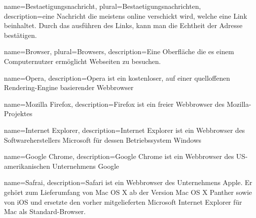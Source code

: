 \documentclass[parskip=full]{scrartcl}
\begin{document}

{
	name=Bestaetigungsnachricht,
	plural=Bestaetigungsnachrichten,
	description={eine Nachricht die meistens online verschickt wird, welche eine Link beinhaltet. Durch das ausführen des Links, kann man die Echtheit der Adresse bestätigen.}
}

{
	name=Browser,
	plural=Browsers,
	description={Eine Oberfläche die es einem \gls{Computer}nutzer ermöglicht Webseiten zu besuchen.}
}

{
	name=Opera,
	description={Opera ist ein kostenloser, auf einer quelloffenen Rendering-Engine basierender Webbrowser}
}

{
	name=Mozilla Firefox,
	description={Firefox ist ein freier Webbrowser des Mozilla-Projektes}
}

{
	name=Internet Explorer,
	description={Internet Explorer ist ein Webbrowser des Softwareherstellers Microsoft für dessen Betriebssystem Windows}
}

{
	name=Google Chrome,
	description={Google Chrome ist ein Webbrowser des US-amerikanischen Unternehmens Google}
}

{
	name=Safrai,
	description={Safari ist ein Webbrowser des Unternehmens Apple. Er gehört zum Lieferumfang von Mac OS X ab der Version Mac OS X Panther sowie von iOS und ersetzte den vorher mitgelieferten Microsoft Internet Explorer für Mac als Standard-Browser.}
}
\end{document}
